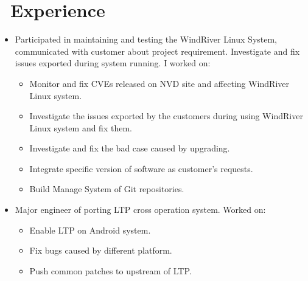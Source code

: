 \documentclass{resume}
\begin{document}
\section{\faUsers\ Experience}\normalsize
{}
\begin{itemize}
\item Participated in maintaining and testing the WindRiver Linux System, communicated with customer about project requirement. Investigate and fix issues exported during system running. I worked on:
  \begin{itemize}
    \item Monitor and fix CVEs released on NVD site and affecting WindRiver Linux system.
    \item Investigate the issues exported by the customers during using WindRiver Linux system and fix them.
    \item Investigate and fix the bad case caused by upgrading.
    \item Integrate specific version of software as customer's requests.
      \item Build Manage System of Git repositories.
    \end{itemize}

  \end{itemize}


{}
\begin{itemize}
\item Major engineer of porting LTP cross operation system. Worked on:
  \begin{itemize}
  \item Enable LTP on Android system.
  \item Fix bugs caused by different platform.
  \item Push common patches to upstream of LTP.
  \end{itemize}
\end{itemize}
\end{document}
